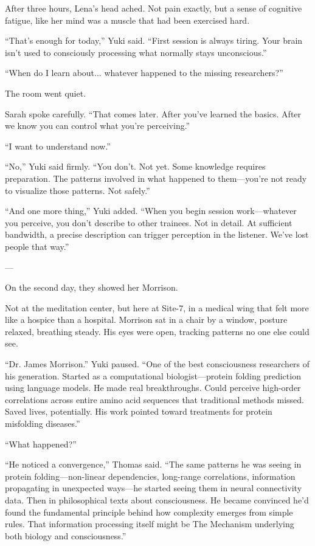 After three hours, Lena's head ached. Not pain exactly, but a sense of cognitive fatigue, like her mind was a muscle that had been exercised hard.

``That's enough for today,'' Yuki said. ``First session is always tiring. Your brain isn't used to consciously processing what normally stays unconscious.''

``When do I learn about... whatever happened to the missing researchers?''

The room went quiet.

Sarah spoke carefully. ``That comes later. After you've learned the basics. After we know you can control what you're perceiving.''

``I want to understand now.''

``No,'' Yuki said firmly. ``You don't. Not yet. Some knowledge requires preparation. The patterns involved in what happened to them—you're not ready to visualize those patterns. Not safely.''

``And one more thing,'' Yuki added. ``When you begin session work—whatever you perceive, you don't describe to other trainees. Not in detail. At sufficient bandwidth, a precise description can trigger perception in the listener. We've lost people that way.''

---

On the second day, they showed her Morrison.

Not at the meditation center, but here at Site-7, in a medical wing that felt more like a hospice than a hospital. Morrison sat in a chair by a window, posture relaxed, breathing steady. His eyes were open, tracking patterns no one else could see.

``Dr. James Morrison.'' Yuki paused. ``One of the best consciousness researchers of his generation. Started as a computational biologist—protein folding prediction using language models. He made real breakthroughs. Could perceive high-order correlations across entire amino acid sequences that traditional methods missed. Saved lives, potentially. His work pointed toward treatments for protein misfolding diseases.''

``What happened?''

``He noticed a convergence,'' Thomas said. ``The same patterns he was seeing in protein folding—non-linear dependencies, long-range correlations, information propagating in unexpected ways—he started seeing them in neural connectivity data. Then in philosophical texts about consciousness. He became convinced he'd found the fundamental principle behind how complexity emerges from simple rules. That information processing itself might be The Mechanism underlying both biology and consciousness.''

